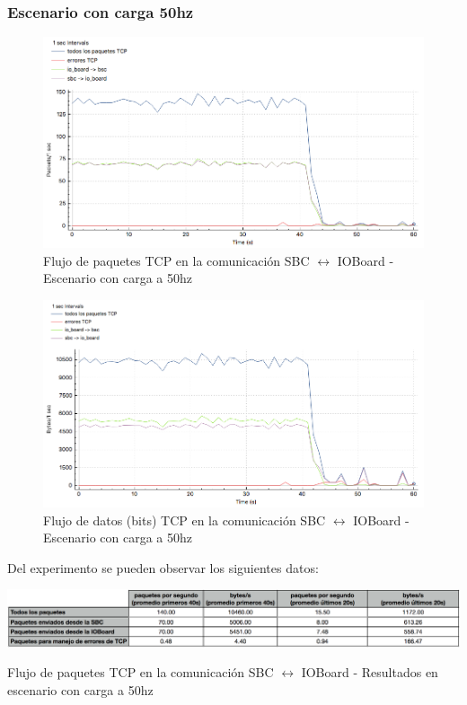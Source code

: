 \documentclass[withindex,glossary]{cam-thesis}
\begin{document}
\subsubsection{Escenario con carga 50hz}
\begin{figure}[H]
  \centering
  	\includegraphics[width=\textwidth]{images/TCP_Throughput_io_to_pc_50hz_pps}
  	\caption[Throughput de la conexión TCP - Básico]{Flujo de paquetes TCP en la comunicación SBC $\leftrightarrow$ IOBoard -  Escenario con carga a 50hz}
  \label{fig:TCP_Throughput_io_to_pc_50hz_pps}
\end{figure}

\begin{figure}[H]
  \centering
  	\includegraphics[width=\textwidth]{images/TCP_Throughput_io_to_pc_50hz_bps}
  	\caption[Throughput de la conexión TCP - Básico]{Flujo de datos (bits) TCP en la comunicación SBC $\leftrightarrow$ IOBoard -  Escenario con carga a 50hz}
  \label{fig:TCP_Throughput_io_to_pc_50hz_bps}
\end{figure}
Del experimento se pueden observar los siguientes datos:
\begin{table}[H]
	\centering
 	\begin{minipage}[b]{\textwidth}  	
  		\includegraphics[width=\textwidth]{images/TCP_Throughput_io_to_pc_50hz_results}
  		\caption[Throughput de la conexión TCP - Básico]{Flujo de paquetes TCP en la comunicación SBC $\leftrightarrow$ IOBoard -  Resultados en escenario con carga a 50hz}
		\label{fig:TCP_Throughput_io_to_pc_50hz_results}
	\end{minipage}
\end{table}
\end{document}
